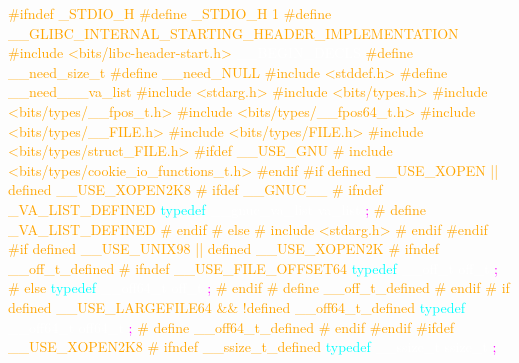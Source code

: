 \justifying \small 

\textcolor{orange}{\#ifndef \_STDIO\_H} 
\textcolor{orange}{\#define \_STDIO\_H	1} 
\textcolor{orange}{\#define \_\_GLIBC\_INTERNAL\_STARTING\_HEADER\_IMPLEMENTATION} 
\textcolor{orange}{\#include <bits/libc-header-start.h>} 
\textcolor{white}{\_\_BEGIN\_DECLS} 
\textcolor{orange}{\#define \_\_need\_size\_t} 
\textcolor{orange}{\#define \_\_need\_NULL} 
\textcolor{orange}{\#include <stddef.h>} 
\textcolor{orange}{\#define \_\_need\_\_\_va\_list} 
\textcolor{orange}{\#include <stdarg.h>} 
\textcolor{orange}{\#include <bits/types.h>} 
\textcolor{orange}{\#include <bits/types/\_\_fpos\_t.h>} 
\textcolor{orange}{\#include <bits/types/\_\_fpos64\_t.h>} 
\textcolor{orange}{\#include <bits/types/\_\_FILE.h>} 
\textcolor{orange}{\#include <bits/types/FILE.h>} 
\textcolor{orange}{\#include <bits/types/struct\_FILE.h>} 
\textcolor{orange}{\#ifdef \_\_USE\_GNU} 
\textcolor{orange}{\# include <bits/types/cookie\_io\_functions\_t.h>} 
\textcolor{orange}{\#endif} 
\textcolor{orange}{\#if defined \_\_USE\_XOPEN || defined \_\_USE\_XOPEN2K8} 
\textcolor{orange}{\# ifdef \_\_GNUC\_\_} 
\textcolor{orange}{\# ifndef \_VA\_LIST\_DEFINED} 
\textcolor{cyan}{typedef} 
\textcolor{white}{\_\_gnuc\_va\_list} 
\textcolor{white}{va\_list} 
\textcolor{magenta}{;} 
\textcolor{orange}{\# define \_VA\_LIST\_DEFINED} 
\textcolor{orange}{\# endif} 
\textcolor{orange}{\# else} 
\textcolor{orange}{\# include <stdarg.h>} 
\textcolor{orange}{\# endif} 
\textcolor{orange}{\#endif} 
\textcolor{orange}{\#if defined \_\_USE\_UNIX98 || defined \_\_USE\_XOPEN2K} 
\textcolor{orange}{\# ifndef \_\_off\_t\_defined} 
\textcolor{orange}{\# ifndef \_\_USE\_FILE\_OFFSET64} 
\textcolor{cyan}{typedef} 
\textcolor{white}{\_\_off\_t} 
\textcolor{white}{off\_t} 
\textcolor{magenta}{;} 
\textcolor{orange}{\# else} 
\textcolor{cyan}{typedef} 
\textcolor{white}{\_\_off64\_t} 
\textcolor{white}{off\_t} 
\textcolor{magenta}{;} 
\textcolor{orange}{\# endif} 
\textcolor{orange}{\# define \_\_off\_t\_defined} 
\textcolor{orange}{\# endif} 
\textcolor{orange}{\# if defined \_\_USE\_LARGEFILE64 \&\& !defined \_\_off64\_t\_defined} 
\textcolor{cyan}{typedef} 
\textcolor{white}{\_\_off64\_t} 
\textcolor{white}{off64\_t} 
\textcolor{magenta}{;} 
\textcolor{orange}{\# define \_\_off64\_t\_defined} 
\textcolor{orange}{\# endif} 
\textcolor{orange}{\#endif} 
\textcolor{orange}{\#ifdef \_\_USE\_XOPEN2K8} 
\textcolor{orange}{\# ifndef \_\_ssize\_t\_defined} 
\textcolor{cyan}{typedef} 
\textcolor{white}{\_\_ssize\_t} 
\textcolor{white}{ssize\_t} 
\textcolor{magenta}{;} 
